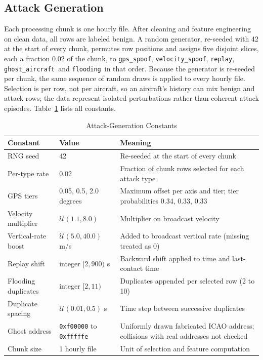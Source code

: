 \documentclass[conference]{IEEEtran}
\newcommand{\gps}{\texttt{gps\_spoof}}
\newcommand{\vel}{\texttt{velocity\_spoof}}
\newcommand{\replay}{\texttt{replay}}
\newcommand{\ghost}{\texttt{ghost\_aircraft}}
\newcommand{\flood}{\texttt{flooding}}
\begin{document}
\subsection{Attack Generation}
Each processing chunk is one hourly file. After cleaning and feature engineering on clean data, all rows are labeled benign. A random generator, re-seeded with 42 at the start of every chunk, permutes row positions and assigns five disjoint slices, each a fraction 0.02 of the chunk, to \gps, \vel, \replay, \ghost\ and \flood\ in that order. Because the generator is re-seeded per chunk, the same sequence of random draws is applied to every hourly file. Selection is per row, not per aircraft, so an aircraft's history can mix benign and attack rows; the data represent isolated perturbations rather than coherent attack episodes. Table~\ref{tab:constants} lists all constants.

\begin{table}[!t]\caption{Attack-Generation Constants}\label{tab:constants}\centering\footnotesize
\begin{tabularx}{\textwidth}{l l X}\toprule Constant & Value & Meaning \\\midrule
RNG seed & 42 & Re-seeded at the start of every chunk \\
Per-type rate & 0.02 & Fraction of chunk rows selected for each attack type \\
GPS tiers & 0.05, 0.5, 2.0 degrees & Maximum offset per axis and tier; tier probabilities 0.34, 0.33, 0.33 \\
Velocity multiplier & $\mathcal{U}(1.1, 8.0)$ & Multiplier on broadcast velocity \\
Vertical-rate boost & $\mathcal{U}(5.0, 40.0)$ m/s & Added to broadcast vertical rate (missing treated as 0) \\
Replay shift & integer $[2, 900)$ s & Backward shift applied to time and last-contact time \\
Flooding duplicates & integer $[2, 11)$ & Duplicates appended per selected row (2 to 10) \\
Duplicate spacing & $\mathcal{U}(0.01, 0.5)$ s & Time step between successive duplicates \\
Ghost address & \texttt{0xf00000} to \texttt{0xfffffe} & Uniformly drawn fabricated ICAO address; collisions with real addresses not checked \\
Chunk size & 1 hourly file & Unit of selection and feature computation \\
\bottomrule\end{tabularx}\end{table}
\end{document}
